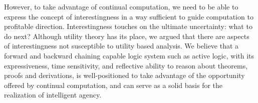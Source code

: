 \documentclass[]{llncs}
\begin{document}
However, to take advantage of continual computation, we need to be able to
express the concept of interestingness in a way sufficient to guide
computation to profitable direction.  Interestingness touches on the
ultimate uncertainty: what to do next?  Although utility theory has its
place, we argued that there are aspects of interestingness not susceptible
to utility based analysis.  We believe that a forward and backward chaining
capable logic system such as active logic, with its expressiveness, time
sensitivity, and reflective ability to reason about theorems, proofs and
derivations, is well-positioned to take advantage of the opportunity
offered by continual computation, and can serve as a solid basis for the
realization of intelligent agency.






\end{document}
